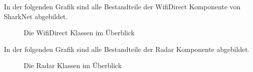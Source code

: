 \newpage

In der folgenden Grafik sind alle Bestandteile der WifiDirect Komponente von SharkNet abgebildet.
\begin{figure}[H]
	\centering
	\hspace*{1cm}
	\caption{Die WifiDirect Klassen im Überblick}
	\label{fig:wifiAll}
\end{figure}

\newpage

In der folgenden Grafik sind alle Bestandteile der Radar Komponente abgebildet.
\begin{figure}[H]
	\centering
	\hspace*{1cm}
	\caption{Die Radar Klassen im Überblick}
	\label{fig:radarAll}
\end{figure}

